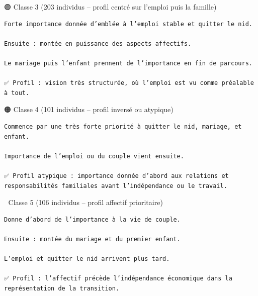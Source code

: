 \documentclass[
]{article}
\begin{document}
🟣 Classe 3 (203 individus -- profil centré sur l'emploi puis la
famille)

\begin{verbatim}
Forte importance donnée d’emblée à l’emploi stable et quitter le nid.

Ensuite : montée en puissance des aspects affectifs.

Le mariage puis l’enfant prennent de l’importance en fin de parcours. 

✅ Profil : vision très structurée, où l’emploi est vu comme préalable à tout.
\end{verbatim}

🟠 Classe 4 (101 individus -- profil inversé ou atypique)

\begin{verbatim}
Commence par une très forte priorité à quitter le nid, mariage, et enfant.

Importance de l’emploi ou du couple vient ensuite. 

✅ Profil atypique : importance donnée d’abord aux relations et responsabilités familiales avant l’indépendance ou le travail.
\end{verbatim}

🔵 Classe 5 (106 individus -- profil affectif prioritaire)

\begin{verbatim}
Donne d’abord de l’importance à la vie de couple.

Ensuite : montée du mariage et du premier enfant.

L’emploi et quitter le nid arrivent plus tard. 

✅ Profil : l’affectif précède l’indépendance économique dans la représentation de la transition.
\end{verbatim}
\end{document}
